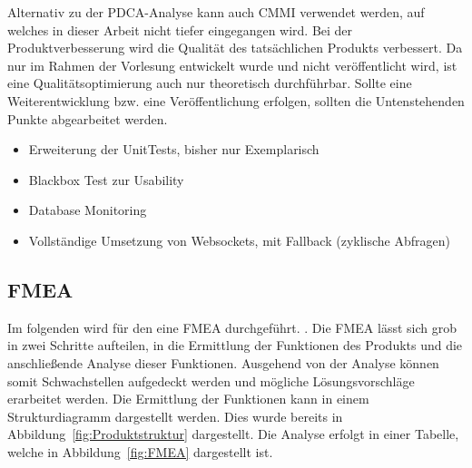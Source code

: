 Alternativ zu der PDCA-Analyse kann auch \ac{CMMI} verwendet werden, auf welches in dieser Arbeit nicht tiefer eingegangen wird.
\newparagraph
Bei der Produktverbesserung wird die Qualität des tatsächlichen Produkts verbessert.
Da  nur im Rahmen der Vorlesung entwickelt wurde und nicht veröffentlicht wird, ist eine Qualitätsoptimierung auch nur theoretisch durchführbar. 
Sollte eine Weiterentwicklung bzw. eine Veröffentlichung erfolgen, sollten die Untenstehenden Punkte abgearbeitet werden.
\begin{itemize}
    \item Erweiterung der UnitTests, bisher nur Exemplarisch
    \item Blackbox Test zur Usability
    \item Database Monitoring
    \item Vollständige Umsetzung von Websockets, mit Fallback (zyklische Abfragen)
\end{itemize}

\subsection{\acl{FMEA}}
\label{sec:FMEA}
Im folgenden wird für den  eine \ac{FMEA} durchgeführt.
 \autocite[][]{noauthor_fmea_nodate}.
\newparagraph
Die \ac{FMEA} lässt sich grob in zwei Schritte aufteilen, in die Ermittlung der Funktionen des Produkts und die anschließende Analyse dieser Funktionen.
Ausgehend von der Analyse können somit Schwachstellen aufgedeckt werden und mögliche Lösungsvorschläge erarbeitet werden.
Die Ermittlung der Funktionen kann in einem Strukturdiagramm dargestellt werden.
Dies wurde bereits in Abbildung~\ref{fig:Produktstruktur} dargestellt.
Die Analyse erfolgt in einer Tabelle, welche in Abbildung~\ref{fig:FMEA} dargestellt ist.





